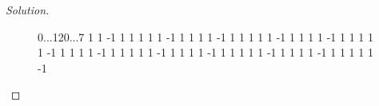\documentclass{amsart}
\begin{document}
\begin{proof}[Solution]
\begin{figure}
  \centering
\begin{sseq}[entrysize=5mm, gridstroke=.05pt, xlabels={-n; ; ;;;;; -; ;;; ; -n+12}]{0...12}{0...7}
\ssdropbull
{} 1
\ssdropbull \ssstroke
{} 1
\ssdropbull \ssstroke
{} {-1}
\ssdropbull \ssstroke
{} 1
\ssdropbull \ssstroke
{} 1
\ssdropbull \ssstroke
{} 1
\ssdropbull
{} 1
\ssdropbull \ssstroke
{} 1
\ssdropbull \ssstroke
{} {-1}
\ssdropbull \ssstroke
{} 1
\ssdropbull \ssstroke
{} 1
\ssdropbull \ssstroke
{}
\ssdropbull
{} 1
\ssdropbull \ssstroke
{} 1
\ssdropbull \ssstroke
{} {-1}
\ssdropbull \ssstroke
{} 1
\ssdropbull \ssstroke
{} 1
\ssdropbull \ssstroke
{} 1
\ssdropbull
{} 1
\ssdropbull \ssstroke
{} 1
\ssdropbull \ssstroke
{} {-1}
\ssdropbull \ssstroke
{} 1
\ssdropbull \ssstroke
{} 1
\ssdropbull \ssstroke
{}
\ssdropbull
{} 1
\ssdropbull \ssstroke
{} 1
\ssdropbull \ssstroke
{} {-1}
\ssdropbull \ssstroke
{} 1
\ssdropbull \ssstroke
{} 1
\ssdropbull \ssstroke
{} 1
\ssdropbull
{} 1
\ssdropbull \ssstroke
{} 1
\ssdropbull \ssstroke
{} {-1}
\ssdropbull \ssstroke
{} 1
\ssdropbull \ssstroke
{} 1
\ssdropbull \ssstroke
{}
\ssdropbull
{} 1
\ssdropbull \ssstroke
{} 1
\ssdropbull \ssstroke
{} {-1}
\ssdropbull \ssstroke
{} 1
\ssdropbull \ssstroke
{} 1
\ssdropbull \ssstroke
{} 1
\ssdropbull
{} 1
\ssdropbull \ssstroke
{} 1
\ssdropbull \ssstroke
{} {-1}
\ssdropbull \ssstroke
{} 1
\ssdropbull \ssstroke
{} 1
\ssdropbull \ssstroke
{}
\ssdropbull
{} 1
\ssdropbull \ssstroke
{} 1
\ssdropbull \ssstroke
{} {-1}
\ssdropbull \ssstroke
{} 1
\ssdropbull \ssstroke
{} 1
\ssdropbull \ssstroke
{} 1
\ssdropbull
{} 1
\ssdropbull \ssstroke
{} 1
\ssdropbull \ssstroke
{} {-1}
\ssdropbull \ssstroke
{} 1
\ssdropbull \ssstroke
{} 1
\ssdropbull \ssstroke
{}
\ssdropbull
{} 1
\ssdropbull \ssstroke
{} 1
\ssdropbull \ssstroke
{} {-1}
\ssdropbull \ssstroke
{} 1
\ssdropbull \ssstroke
{} 1
\ssdropbull \ssstroke
{} 1
\ssdropbull
{} 1
\ssdropbull \ssstroke
{} 1
\ssdropbull \ssstroke
{} {-1}
\ssdropbull \ssstroke

\end{sseq}
\end{figure}
\end{proof}
\end{document}
